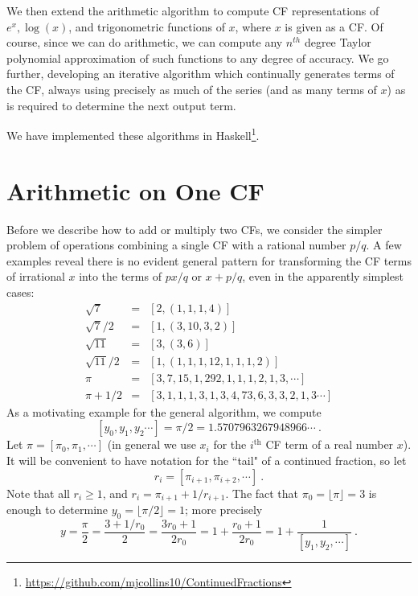 \documentclass[11pt, oneside]{amsart}   	%
\renewcommand{\:}{\negthickspace:\negthickspace}
\begin{document}
We then extend the arithmetic algorithm to compute CF representations of $e^x, \log(x)$, and trigonometric functions of $x$, where $x$ is given as a CF. 
Of course, since we can do arithmetic, we can compute any $n^{th}$ degree Taylor polynomial approximation of such functions to any degree of accuracy.
We go further, developing an iterative algorithm which continually generates terms of the CF, always using precisely as much of the series (and as many terms of $x$) as is required to determine the next output term.

We have implemented these algorithms
in Haskell\footnote{\href{https://github.com/mjcollins10/ContinuedFractions}{https://github.com/mjcollins10/ContinuedFractions}}.


\section{Arithmetic on One CF}
Before we describe how to add or multiply two CFs, we consider the simpler problem of operations combining a single CF with a
rational number $p/q$. A few examples reveal there is no evident general pattern for transforming the CF terms of irrational $x$ into
the terms of $px/q$ or $x + p/q$, even in the apparently simplest cases:
\begin{eqnarray*}
\sqrt{7} & = & [2, (1, 1, 1, 4)] \\
\sqrt{7}/2 & = & [1, (3, 10, 3, 2)] \\
\sqrt{11} & = & [3, (3, 6)] \\
\sqrt{11}/2 & = & [1, (1, 1, 1, 12, 1, 1, 1, 2)] \\
\pi & = & [3,7,15,1,292,1,1,1, 2, 1, 3,\cdots]\\
\pi + 1/2 & = & [3, 1, 1, 1, 3, 1, 3, 4, 73, 6, 3, 3, 2, 1, 3\cdots]
\end{eqnarray*}
As a motivating example for the general algorithm, we compute
\[[y_0,y_1,y_2 \cdots] = \pi/2 = 1.5707963267948966\cdots\ .
\]
Let $\pi = [\pi_0,\pi_1,\cdots]$ (in general we use $x_i$ for the $i^{\mbox {th}}$ CF term of a real number $x$). It will be convenient to have notation for the ``tail" of a continued fraction, so let
\[
r_i = [\pi_{i+1}, \pi_{i+2},\cdots]\ .
\]
Note that all $r_i \geq 1$, and $r_i = \pi_{i+1} + 1/r_{i+1}$. The fact that $\pi_0 = \lfloor \pi \rfloor= 3$
is enough to determine $y_0=\lfloor \pi/2 \rfloor=1$; more precisely
\begin{equation*}
y = \frac{\pi}{2} = \frac{3 + 1/r_0}{2} = \frac{3r_0+1}{2r_0} = 1 + \frac{r_0+1}{2r_0}= 1 + \frac{1}{[y_1,y_2,\cdots]}\ .
\end{equation*}
\end{document}
